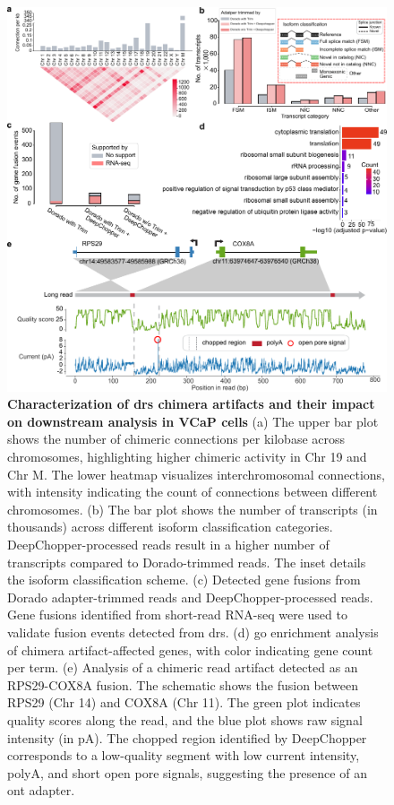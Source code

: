 \documentclass[pdflatex,sn-nature, lineno]{sn-jnl}%
\begin{document}
\begin{figure}[!ht]
	\includegraphics[height=1\columnwidth]{finals/figure3}
	\caption{{\bf Characterization of \gls{drs} chimera artifacts and their impact on downstream analysis in VCaP cells} (a) The upper bar plot shows the number of chimeric connections per kilobase across chromosomes, highlighting higher chimeric activity in Chr 19 and Chr M. The lower heatmap visualizes interchromosomal connections, with intensity indicating the count of connections between different chromosomes. (b) The bar plot shows the number of transcripts (in thousands) across different isoform classification categories. DeepChopper-processed reads result in a higher number of transcripts compared to Dorado-trimmed reads. The inset details the isoform classification scheme. (c) Detected gene fusions from Dorado adapter-trimmed reads and DeepChopper-processed reads. Gene fusions identified from short-read RNA-seq were used to validate fusion events detected from \gls{drs}. (d) \gls{go} enrichment analysis of chimera artifact-affected genes, with color indicating gene count per term. (e) Analysis of a chimeric read artifact detected as an RPS29-COX8A fusion. The schematic shows the fusion between RPS29 (Chr 14) and COX8A (Chr 11). The green plot indicates quality scores along the read, and the blue plot shows raw signal intensity (in pA). The chopped region identified by DeepChopper corresponds to a low-quality segment with low current intensity, polyA, and short open pore signals, suggesting the presence of an \gls{ont} adapter.}\label{fig:f3}
\end{figure}
\end{document}
